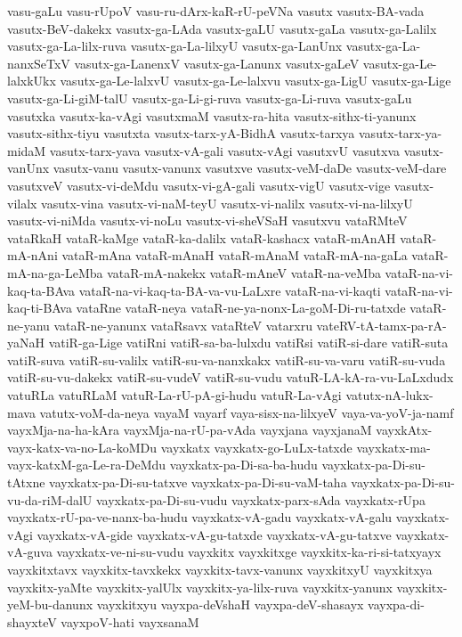 {vasu-gaLu
vasu-rUpoV
vasu-ru-dArx-kaR-rU-peVNa
vasutx
vasutx-BA-vada
vasutx-BeV-dakekx
vasutx-ga-LAda
vasutx-gaLU
vasutx-gaLa
vasutx-ga-Lalilx
vasutx-ga-La-lilx-ruva
vasutx-ga-La-lilxyU
vasutx-ga-LanUnx
vasutx-ga-La-nanxSeTxV
vasutx-ga-LanenxV
vasutx-ga-Lanunx
vasutx-gaLeV
vasutx-ga-Le-lalxkUkx
vasutx-ga-Le-lalxvU
vasutx-ga-Le-lalxvu
vasutx-ga-LigU
vasutx-ga-Lige
vasutx-ga-Li-giM-talU
vasutx-ga-Li-gi-ruva
vasutx-ga-Li-ruva
vasutx-gaLu
vasutxka
vasutx-ka-vAgi
vasutxmaM
vasutx-ra-hita
vasutx-sithx-ti-yanunx
vasutx-sithx-tiyu
vasutxta
vasutx-tarx-yA-BidhA
vasutx-tarxya
vasutx-tarx-ya-midaM
vasutx-tarx-yava
vasutx-vA-gali
vasutx-vAgi
vasutxvU
vasutxva
vasutx-vanUnx
vasutx-vanu
vasutx-vanunx
vasutxve
vasutx-veM-daDe
vasutx-veM-dare
vasutxveV
vasutx-vi-deMdu
vasutx-vi-gA-gali
vasutx-vigU
vasutx-vige
vasutx-vilalx
vasutx-vina
vasutx-vi-naM-teyU
vasutx-vi-nalilx
vasutx-vi-na-lilxyU
vasutx-vi-niMda
vasutx-vi-noLu
vasutx-vi-sheVSaH
vasutxvu
vataRMteV
vataRkaH
vataR-kaMge
vataR-ka-dalilx
vataR-kashacx
vataR-mAnAH
vataR-mA-nAni
vataR-mAna
vataR-mAnaH
vataR-mAnaM
vataR-mA-na-gaLa
vataR-mA-na-ga-LeMba
vataR-mA-nakekx
vataR-mAneV
vataR-na-veMba
vataR-na-vi-kaq-ta-BAva
vataR-na-vi-kaq-ta-BA-va-vu-LaLxre
vataR-na-vi-kaqti
vataR-na-vi-kaq-ti-BAva
vataRne
vataR-neya
vataR-ne-ya-nonx-La-goM-Di-ru-tatxde
vataR-ne-yanu
vataR-ne-yanunx
vataRsavx
vataRteV
vatarxru
vateRV-tA-tamx-pa-rA-yaNaH
vatiR-ga-Lige
vatiRni
vatiR-sa-ba-lulxdu
vatiRsi
vatiR-si-dare
vatiR-suta
vatiR-suva
vatiR-su-valilx
vatiR-su-va-nanxkakx
vatiR-su-va-varu
vatiR-su-vuda
vatiR-su-vu-dakekx
vatiR-su-vudeV
vatiR-su-vudu
vatuR-LA-kA-ra-vu-LaLxdudx
vatuRLa
vatuRLaM
vatuR-La-rU-pA-gi-hudu
vatuR-La-vAgi
vatutx-nA-lukx-mava
vatutx-voM-da-neya
vayaM
vayarf
vaya-sisx-na-lilxyeV
vaya-va-yoV-ja-namf
vayxMja-na-ha-kAra
vayxMja-na-rU-pa-vAda
vayxjana
vayxjanaM
vayxkAtx-vayx-katx-va-no-La-koMDu
vayxkatx
vayxkatx-go-LuLx-tatxde
vayxkatx-ma-vayx-katxM-ga-Le-ra-DeMdu
vayxkatx-pa-Di-sa-ba-hudu
vayxkatx-pa-Di-su-tAtxne
vayxkatx-pa-Di-su-tatxve
vayxkatx-pa-Di-su-vaM-taha
vayxkatx-pa-Di-su-vu-da-riM-dalU
vayxkatx-pa-Di-su-vudu
vayxkatx-parx-sAda
vayxkatx-rUpa
vayxkatx-rU-pa-ve-nanx-ba-hudu
vayxkatx-vA-gadu
vayxkatx-vA-galu
vayxkatx-vAgi
vayxkatx-vA-gide
vayxkatx-vA-gu-tatxde
vayxkatx-vA-gu-tatxve
vayxkatx-vA-guva
vayxkatx-ve-ni-su-vudu
vayxkitx
vayxkitxge
vayxkitx-ka-ri-si-tatxyayx
vayxkitxtavx
vayxkitx-tavxkekx
vayxkitx-tavx-vanunx
vayxkitxyU
vayxkitxya
vayxkitx-yaMte
vayxkitx-yalUlx
vayxkitx-ya-lilx-ruva
vayxkitx-yanunx
vayxkitx-yeM-bu-danunx
vayxkitxyu
vayxpa-deVshaH
vayxpa-deV-shasayx
vayxpa-di-shayxteV
vayxpoV-hati
vayxsanaM
}
